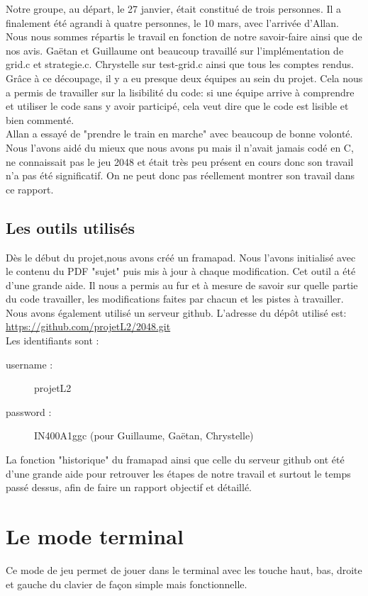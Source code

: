 \documentclass{report}
\begin{document}
Notre groupe, au départ, le 27 janvier, était constitué de trois personnes. Il a finalement été agrandi à quatre personnes, le 10 mars, avec l'arrivée d'Allan.\\ Nous nous sommes répartis le travail en fonction de notre savoir-faire ainsi que de nos avis. Gaëtan et Guillaume ont beaucoup travaillé sur l'implémentation de grid.c et strategie.c. Chrystelle sur test-grid.c ainsi que tous les comptes rendus. Grâce à ce découpage, il y a eu presque deux équipes au sein du projet. Cela nous a permis de travailler sur la lisibilité du code: si une équipe arrive à comprendre et utiliser le code sans y avoir participé, cela veut dire que le code est lisible et bien commenté.\\ Allan a essayé de "prendre le train en marche" avec beaucoup de bonne volonté. Nous l'avons aidé du mieux que nous avons pu mais il n'avait jamais codé en C, ne connaissait pas le jeu 2048 et était très peu présent en cours donc son travail n'a pas été significatif. On ne peut donc pas réellement montrer son travail dans ce rapport.
\section{Les outils utilisés}
Dès le début du projet,nous avons créé un framapad. Nous l'avons initialisé avec le contenu du PDF "sujet" puis mis à jour à chaque modification. Cet outil a été d'une grande aide. Il nous a permis au fur et à mesure de savoir sur quelle partie du code travailler, les modifications faites par chacun et les pistes à travailler. \\
Nous avons également utilisé un serveur github. L'adresse du dépôt utilisé est: \url{https://github.com/projetL2/2048.git} \\Les identifiants sont :
\begin{description}
\item [username : ] projetL2
\item [password : ] IN400A1ggc  (pour Guillaume, Gaëtan, Chrystelle)
\end{description}
La fonction "historique" du framapad ainsi que celle du serveur github ont été d'une grande aide pour retrouver les étapes de notre travail et surtout le temps passé dessus, afin de faire un rapport objectif et détaillé.

\chapter{Le mode terminal}
Ce mode de jeu permet de jouer dans le terminal avec les touche haut, bas, droite et gauche du clavier de façon simple mais fonctionnelle.
\end{document}

